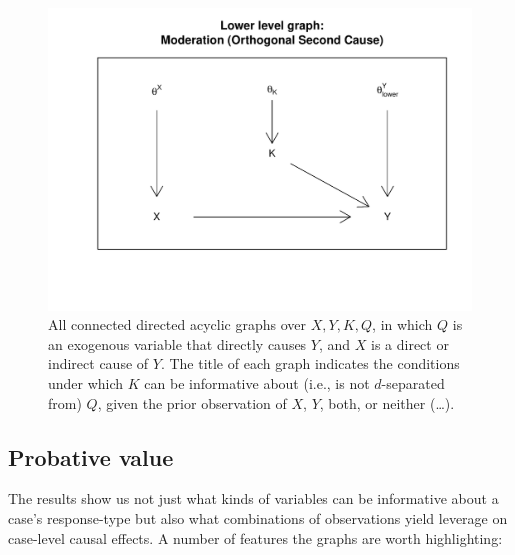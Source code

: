 \documentclass[12pt,]{book}
\begin{document}
\begin{figure}
\centering
\includegraphics{ii_files/figure-latex/unnamed-chunk-35-1.pdf}
\caption{\label{fig:unnamed-chunk-35}\label{fig:34graphs} All connected directed acyclic graphs over \(X,Y,K,Q\), in which \(Q\) is an exogenous variable that directly causes \(Y\), and \(X\) is a direct or indirect cause of \(Y\). The title of each graph indicates the conditions under which \(K\) can be informative about (i.e., is not \(d\)-separated from) \(Q\), given the prior observation of \(X\), \(Y\), both, or neither (\ldots{}).}
\end{figure}

\hypertarget{probative-value}{%
\subsection{Probative value}\label{probative-value}}

The results show us not just what kinds of variables can be informative about a case's response-type but also what combinations of observations yield leverage on case-level causal effects. A number of features the graphs are worth highlighting:
\end{document}
